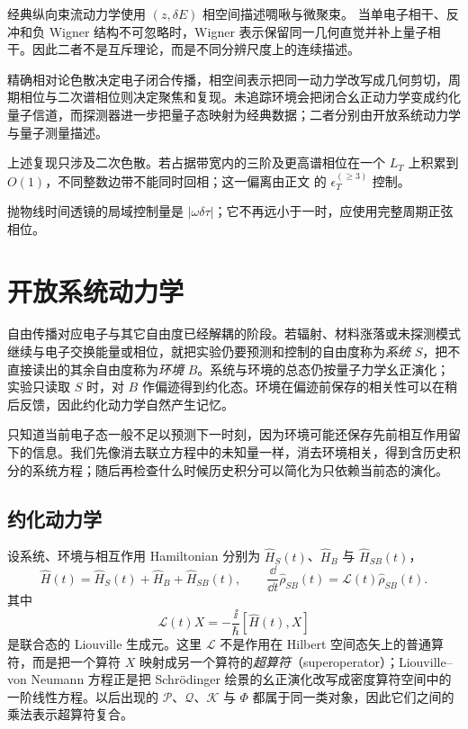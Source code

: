 经典纵向束流动力学使用 $(z,\delta E)$ 相空间描述啁啾与微聚束。\cite{Pellegrini2016FEL} 当单电子相干、反冲和负 Wigner 结构不可忽略时，Wigner 表示保留同一几何直觉并补上量子相干。因此二者不是互斥理论，而是不同分辨尺度上的连续描述。

精确相对论色散决定电子闭合传播，相空间表示把同一动力学改写成几何剪切，周期相位与二次谱相位则决定聚焦和复现。未追踪环境会把闭合幺正动力学变成约化量子信道，而探测器进一步把量子态映射为经典数据；二者分别由开放系统动力学与量子测量描述。

上述复现只涉及二次色散。若占据带宽内的三阶及更高谱相位在一个 $L_T$ 上积累到 $O(1)$，不同整数边带不能同时回相；这一偏离由正文 的 $\epsilon_T^{(\ge3)}$ 控制。

抛物线时间透镜的局域控制量是 $|\omega\delta\tau|$；它不再远小于一时，应使用完整周期正弦相位。



\section{开放系统动力学}

自由传播对应电子与其它自由度已经解耦的阶段。若辐射、材料涨落或未探测模式继续与电子交换能量或相位，就把实验仍要预测和控制的自由度称为\emph{系统} $S$，把不直接读出的其余自由度称为\emph{环境} $B$。系统与环境的总态仍按量子力学幺正演化；实验只读取 $S$ 时，对 $B$ 作偏迹得到约化态。环境在偏迹前保存的相关性可以在稍后反馈，因此约化动力学自然产生记忆。

只知道当前电子态一般不足以预测下一时刻，因为环境可能还保存先前相互作用留下的信息。我们先像消去联立方程中的未知量一样，消去环境相关，得到含历史积分的系统方程；随后再检查什么时候历史积分可以简化为只依赖当前态的演化。

\subsection{约化动力学}

设系统、环境与相互作用 Hamiltonian 分别为 $\hat H_S(t)$、$\hat H_B$ 与 $\hat H_{SB}(t)$，
\begin{equation}
\boxed{
\hat H(t)=\hat H_S(t)+\hat H_B+\hat H_{SB}(t),
\qquad
\frac{\dd}{\dd t}\hat\rho_{SB}(t)=\mathcal L(t)\hat\rho_{SB}(t).}
\label{eq:open_system_joint_liouville_equation}
\end{equation}
其中
\[
\mathcal L(t)X=-\frac{\ii}{\hbar}[\hat H(t),X]
\]
是联合态的 Liouville 生成元。这里 $\mathcal L$ 不是作用在 Hilbert 空间态矢上的普通算符，而是把一个算符 $X$ 映射成另一个算符的\emph{超算符}（superoperator）；Liouville--von Neumann 方程正是把 Schr\"odinger 绘景的幺正演化改写成密度算符空间中的一阶线性方程。以后出现的 $\mathcal P$、$\mathcal Q$、$\mathcal K$ 与 $\Phi$ 都属于同一类对象，因此它们之间的乘法表示超算符复合。

